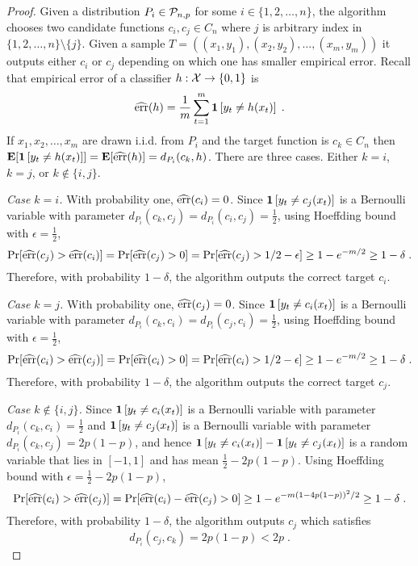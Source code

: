 \begin{proof}
Given a distribution $P_i \in \P_{n,p}$ for some $i \in \{1,2,\dots,n\}$, the
algorithm chooses two candidate functions $c_i, c_j \in C_n$ where $j$ is
arbitrary index in $\{1,2,\dots,n\} \setminus \{j\}$. Given a sample $T =
((x_1, y_1), (x_2, y_2), \dots, (x_m,y_m))$ it outputs either $c_i$ or $c_j$
depending on which one has smaller empirical error. Recall that
empirical error of a classifier $h:\X \to \{0,1\}$ is
$$
\widehat \err(h) = \frac{1}{m} \sum_{t=1}^m \indicator{y_t \neq h(x_t)} \; .
$$
If $x_1, x_2, \dots, x_m$ are drawn i.i.d. from $P_i$
and the target function is $c_k \in C_n$ then
$\Exp[\indicator{y_t \neq h(x_t)}] = \Exp[\widehat \err(h)] = d_{P_i}(c_k, h)$.
There are three cases. Either $k = i$, $k = j$, or $k \not \in \{i,j\}$.

\emph{Case $k=i$.} With probability one, $\widehat \err(c_i) = 0$.
Since $\indicator{y_t \neq c_j(x_t)}$ is a Bernoulli variable with parameter
$d_{P_i}(c_k, c_j) = d_{P_i}(c_i, c_j) = \frac{1}{2}$,
using Hoeffding bound with $\epsilon = \frac{1}{2}$,
$$
\Pr[\widehat \err(c_j) > \widehat \err(c_i)] = \Pr[\widehat \err(c_j) > 0] = \Pr[\widehat \err(c_j) > 1/2 - \epsilon] \ge 1 - e^{-m/2} \ge 1 - \delta \; .
$$
Therefore, with probability $1 - \delta$, the algorithm outputs the correct target $c_i$.

\emph{Case $k=j$.} With probability one, $\widehat \err(c_j) = 0$.
Since $\indicator{y_t \neq c_i(x_t)}$ is a Bernoulli variable with parameter
$d_{P_i}(c_k, c_i) = d_{P_i}(c_j, c_i) = \frac{1}{2}$,
using Hoeffding bound with $\epsilon = \frac{1}{2}$,
$$
\Pr[\widehat \err(c_i) > \widehat \err(c_j)] = \Pr[\widehat \err(c_i) > 0] = \Pr[\widehat \err(c_i) > 1/2 - \epsilon] \ge 1 - e^{-m/2} \ge 1 - \delta \; .
$$
Therefore, with probability $1 - \delta$, the algorithm outputs the correct target $c_j$.

\emph{Case $k \not \in \{i,j\}$.}
Since $\indicator{y_t \neq c_i(x_t)}$ is a Bernoulli variable with parameter
$d_{P_i}(c_k, c_i) = \frac{1}{2}$ and $\indicator{y_t \neq c_j(x_t)}$ is a Bernoulli variable with parameter
$d_{P_i}(c_k, c_j) = 2p(1-p)$, and hence $\indicator{y_t \neq c_i(x_t)} - \indicator{y_t \neq c_j(x_t)}$
is a random variable that lies in $[-1,1]$ and has mean $\frac{1}{2} - 2p(1-p)$.
Using Hoeffding bound with $\epsilon = \frac{1}{2} - 2p(1-p)$,
$$
\Pr[\widehat \err(c_i) > \widehat \err(c_j)] = \Pr[\widehat \err(c_i) - \widehat \err(c_j) > 0] \ge 1 - e^{-m(1 - 4p(1-p))^2/2} \ge 1 - \delta \; .
$$
Therefore, with probability $1 - \delta$, the algorithm outputs $c_j$ which satisfies
$$
d_{P_i}(c_j, c_k) = 2p(1-p) < 2p \; .
$$
\end{proof}

